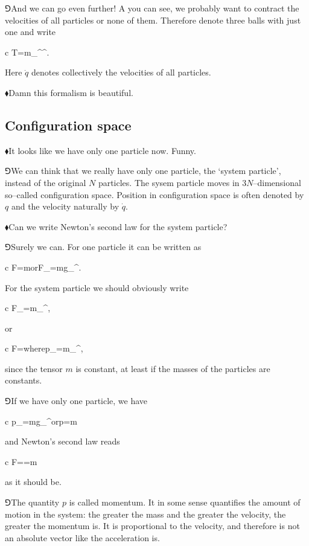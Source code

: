 \documentclass[10pt,oneside%
]{memoir}
\newenvironment{eqna}{\begin{IEEEeqnarray*}{c}}{\end{IEEEeqnarray*}\ignorespacesafterend}
\newcommand{\puoli}{\frac{1}{2}}
\newcommand{\orr}{\qquad\textrm{or}\qquad}
\newcommand{\wheree}{\qquad\textrm{where}\qquad}
\newcommand{\hea}{\(\blacklozenge\)\;}
\newcommand{\heb}{\(\Game\)\;}
\newcommand{\coa}{{\color{black}\bullet}}
\newcommand{\cob}{{\color{oranssi}\bullet}}
\begin{document}
\heb And we can go even further! A you can see, we probably want to contract the velocities of all particles or none of them. Therefore denote three balls with just one and write
\begin{eqna}
    T=\puoli m_{\coa\cob}^\coa{}^\cob.
\end{eqna}
Here \(\dot{q}\) denotes collectively the velocities of all particles.

\hea Damn this formalism is beautiful.
\subsection{Configuration space}
\hea It looks like we have only one particle now. Funny.

\heb We can think that we really have only one particle, the `system particle', instead of the original \(N\) particles. The sysem particle moves in \(3N\)--dimensional so--called configuration space. Position in configuration space is often denoted by \(q\) and the velocity naturally by \(\dot{q}\).

\hea Can we write Newton's second law for the system particle?

\heb Surely we can. For one particle it can be written as
\begin{eqna}
    F=m\orr F_\coa=mg_{\coa\cob}^\cob.
\end{eqna}
For the system particle we should obviously write
\begin{eqna}
    F_\coa=m_{\coa\cob}^\cob,
\end{eqna}
or
\begin{eqna}
    F=\wheree p_\coa=m_{\coa\cob}^\coa,
\end{eqna}
since the tensor \(m\) is constant, at least if the masses of the particles are constants.

\heb If we have only one particle, we have
\begin{eqna}
    p_\coa=mg_{\coa\cob}^\cob\orr p=m
\end{eqna}
and Newton's second law reads
\begin{eqna}
    F==m
\end{eqna}
as it should be.

\heb The quantity \(p\) is called momentum. It in some sense quantifies the amount of motion in the system: the greater the mass and the greater the velocity, the greater the momentum is. It is proportional to the velocity, and therefore is not an absolute vector like the acceleration is.
\end{document}
